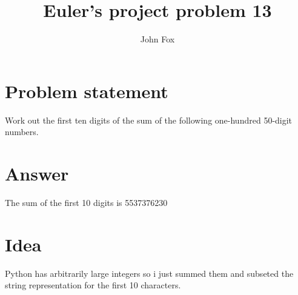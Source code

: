 \documentclass{article}
\title{Euler's project problem 13}
\author{John Fox}
\begin{document}
\maketitle
\large

\section*{Problem statement} 
Work out the first ten digits of the sum of the following one-hundred 50-digit numbers.

\section*{Answer}
The sum of the first 10 digits is 5537376230
\section*{Idea} Python has arbitrarily large integers so i just summed them and subseted the string representation for the first 10 characters. 
\end{document}
